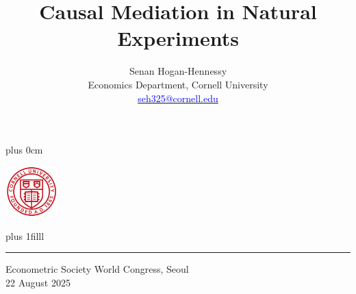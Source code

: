 \documentclass[dvipsnames]{beamer} %
\title{\color{titleText}
    Causal Mediation in Natural Experiments
}
\author[Senan Hogan-Hennessy, Cornell University]{
    Senan Hogan-Hennessy \\
    Economics Department, Cornell University \\ %
    \href{mailto:seh325@cornell.edu}{\textcolor{blue}{seh325@cornell.edu}}
}
\date{} %
\renewcommand{\raggedright}{\leftskip=0pt \rightskip=0pt plus 0cm}
\begin{document}
\raggedright
\begin{frame}
    \vspace{1.5cm}
    \titlepage
    \begin{center}
        \vspace{-1.5cm}
        \includegraphics[width=2cm]{presentation-files/cornell}

        \vskip0pt plus 1filll
        \par\noindent\rule{\textwidth}{0.4pt}
        Econometric Society World Congress, Seoul \\
        22 August 2025
    \end{center}
\end{frame}
\end{document}
